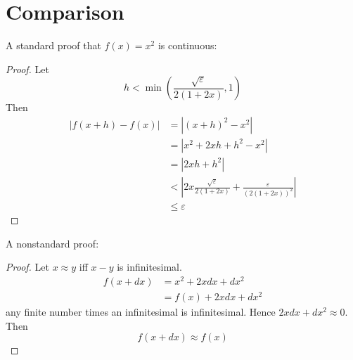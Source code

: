 \documentclass{scrartcl}
\begin{document}
\section{Comparison}
A standard proof that $f(x)=x^2$ is continuous:
\begin{proof}
  Let
  \[
    h < \min\left(\frac{\sqrt\varepsilon}{2(1+2x)},1\right)
  \]
  Then 
  \begin{align*}
    |f(x+h)-f(x)| &= \left| (x+h)^2 - x^2\right| \\
                  &= \left| x^2+2xh+h^2-x^2\right| \\
                  &= \left| 2xh+h^2\right| \\
                  &< \left| 2x\frac{\sqrt\varepsilon}{2(1+2x)} + \frac{\varepsilon}{(2(1+2x))^2} \right|\\
                  &\leq \varepsilon
  \end{align*}
\end{proof}
A nonstandard proof:
\begin{proof}
  Let $x\approx y$ iff $x-y$ is infinitesimal. 
  \begin{align*}
    f(x+dx)&=x^2+2xdx+dx^2\\
           &=f(x)+2xdx+dx^2
  \end{align*}
  any finite number times an infinitesimal is infinitesimal. Hence $2xdx+dx^2\approx 0$. 
  Then 
  \[
    f(x+dx)\approx f(x)
  \]
\end{proof}
\end{document}
